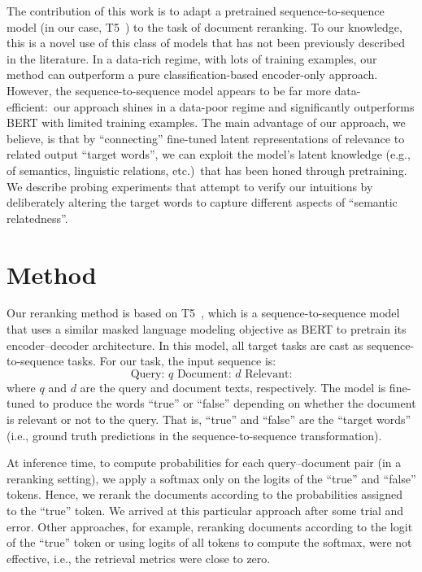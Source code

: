 \documentclass{article}
\begin{document}
The contribution of this work is to adapt a pretrained sequence-to-sequence model (in our case, T5~\cite{raffel2019exploring}) to the task of document reranking.
To our knowledge, this is a novel use of this class of models that has not been previously described in the literature.
In a data-rich regime, with lots of training examples, our method can outperform a pure classification-based encoder-only approach.
However, the sequence-to-sequence model appears to be far more data-efficient:\ our approach shines in a data-poor regime and significantly outperforms BERT with limited training examples.
The main advantage of our approach, we believe, is that by ``connecting'' fine-tuned latent representations of relevance to related output ``target words'', we can exploit the model's latent knowledge (e.g., of semantics, linguistic relations, etc.)\ that has been honed through pretraining.
We describe probing experiments that attempt to verify our intuitions by deliberately altering the target words to capture different aspects of ``semantic relatedness''.

\section{Method}

Our reranking method is based on T5~\cite{raffel2019exploring}, which is a sequence-to-sequence model that uses a similar masked language modeling objective as BERT to pretrain its encoder--decoder architecture.
In this model, all target tasks are cast as sequence-to-sequence tasks.
For our task, the input sequence is:
\begin{equation}
\text{Query: } q \text{ Document: } d \text{ Relevant:}
\end{equation}
\noindent where $q$ and $d$ are the query and document texts, respectively.
The model is fine-tuned to produce the words ``true'' or ``false'' depending on whether the document is relevant or not to the query.
That is, ``true'' and ``false'' are the ``target words'' (i.e., ground truth predictions in the sequence-to-sequence transformation).

At inference time, to compute probabilities for each query--document pair (in a reranking setting), we apply a softmax only on the logits of the ``true'' and ``false'' tokens.
Hence, we rerank the documents according to the probabilities assigned to the ``true'' token.
We arrived at this particular approach after some trial and error.
Other approaches, for example, reranking documents according to the logit of the ``true'' token or using logits of all tokens to compute the softmax, were not effective, i.e., the retrieval metrics were close to zero.
\end{document}
